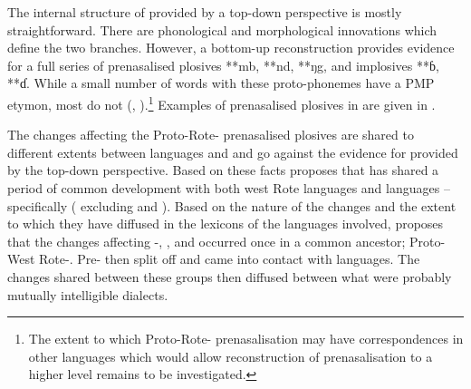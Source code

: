 The internal structure of  provided by a top-down
perspective is mostly straightforward.
There are phonological and morphological innovations which define the two branches.
However, a bottom-up reconstruction provides evidence for a full
series of prenasalised plosives **mb,
**nd, **ŋg, and implosives **ɓ, **ɗ.
While a small number of words with these proto-phonemes have
a PMP etymon, most do not (\citealp[398--402]{Edwards2018a}, \citealp[110--119]{Edwards2023-RMPhon}).\footnote{
		The extent to which
		Proto-Rote- prenasalisation may have correspondences in other
		languages which would allow reconstruction of prenasalisation
		to a higher level remains to be investigated.}
Examples of prenasalised
plosives in  are given in .

The changes affecting the Proto-Rote- prenasalised
plosives are shared to different extents between  languages and  and go against the evidence for 
provided by the top-down perspective.
Based on these facts \citet{Edwards2018c} proposes that 
has shared a period of common development with both west Rote
languages and  languages -- specifically  ( excluding  and ).
Based on the nature of the changes
and the extent to which they have diffused in the lexicons of
the languages involved, \citet{Edwards2018c} proposes that the changes affecting
-, ,
and  occurred once in a common ancestor; Proto-West Rote-.
Pre- then split off
and came into contact with  languages.
The changes shared between these groups
then diffused between what were
probably mutually intelligible dialects.

